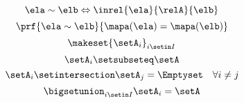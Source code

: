 \begin{forslides}
    \begin{equation}\label{eq:slides_session2_158}
        \ela\sim \elb \Leftrightarrow \inrel{\ela}{\relA}{\elb}
    \end{equation}
    \begin{equation}\label{eq:slides_session2_159}
        \prf{
            \ela\sim \elb
        }{
            \mapa(\ela)=\mapa(\elb)
        }
    \end{equation}
    \begin{equation}\label{eq:slides_session2_160}
        \makeset{\setA_i}_{i\setin I}
    \end{equation}
    \begin{equation}\label{eq:slides_session2_161}
        \setA_i\setsubseteq \setA
    \end{equation}
    \begin{equation}\label{eq:slides_session2_162}
        \setA_i\setintersection \setA_j=\Emptyset \quad \forall i\neq j
    \end{equation}
    \begin{equation}\label{eq:slides_session2_163}
        \bigsetunion_{i\setin I}\setA_i=\setA
    \end{equation}


\end{forslides}
